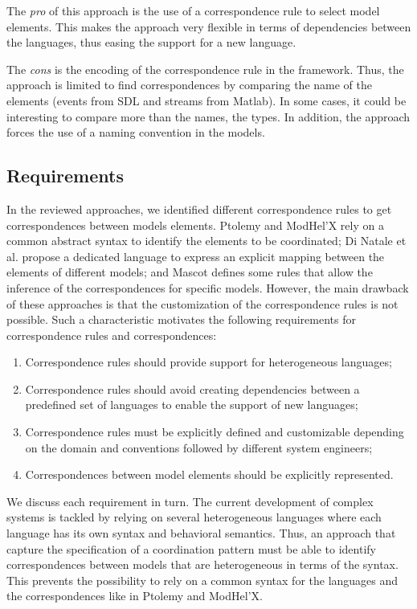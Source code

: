 The \emph{pro} of this approach is the use of a correspondence rule to select model elements. This makes the approach very flexible in terms of dependencies between the languages, thus easing the support for a new language.  

The \emph{cons} is the encoding of the correspondence rule in the framework. Thus, the approach is limited to find correspondences by comparing the name of the elements (\ie events from SDL and streams from Matlab). In some cases, it could be interesting to compare more than the names, \eg the types. In addition, the approach forces the use of a naming convention in the models.     


\subsection{Requirements}
In the reviewed approaches, we identified different correspondence rules to get correspondences between models elements. Ptolemy and ModHel'X rely on a common abstract syntax to identify the elements to be coordinated; Di Natale et al. propose a dedicated language to express an explicit mapping between the elements of different models; and Mascot defines some rules that allow the inference of the correspondences for specific models. However, the main drawback of these approaches is that the customization of the correspondence rules is not possible. Such a characteristic motivates the following requirements for correspondence rules and correspondences:

\begin{enumerate}
	\item Correspondence rules should provide support for heterogeneous languages; 
	\item Correspondence rules should avoid creating dependencies between a predefined set of languages to enable the support of new languages;
	\item Correspondence rules must be explicitly defined and customizable depending on the domain and conventions followed by different system engineers;
	\item Correspondences between model elements should be explicitly represented.  
\end{enumerate}

We discuss each requirement in turn. The current development of complex systems is tackled by relying on several heterogeneous languages where each language has its own syntax and behavioral semantics. Thus, an approach that capture the specification of a coordination pattern must be able to identify correspondences between models that are heterogeneous in terms of the syntax. This prevents the possibility to rely on a common syntax for the languages and the correspondences like in Ptolemy and ModHel'X.


